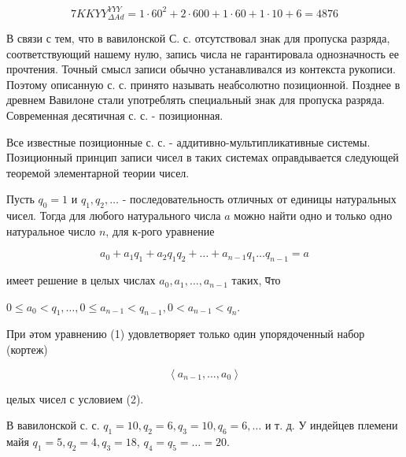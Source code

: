 \documentclass[10pt]{article}
\begin{document}
\[

7 K K Y Y_{\Delta A d}^{Y Y Y}=1 \cdot 60^{2}+2 \cdot 600+1 \cdot 60+1 \cdot 10+6=4876

\]



В связи с тем, что в вавилонской С. с. отсутствовал знак для пропуска разряда, соответствующий нашему нулю, запись числа не гарантировала однозначность ее прочтения. Точный смысл записи обычно устанавливался из контекста рукописи. Поэтому описанную с. с. принято называть неабсолютно позиционной. Позднее в древнем Вавилоне стали употреблять специальный знак для пропуска разряда. Современная десятичная с. с. - позиционная.



Все известные позиционные с. с. - аддитивно-мультипликативные системы. Позиционный принцип записи чисел в таких системах оправдывается следующей теоремой элементарной теории чисел.



Пусть $q_{0}=1$ и $q_{1}, q_{2}, \ldots$ - последовательность отличных от единицы натуральных чисел. Тогда для любого натурального числа $a$ можно найти одно и только одно натуральное число $n$, для к-рого уравнение



\[

a_{0}+a_{1} q_{1}+a_{2} q_{1} q_{2}+\ldots+a_{n-1} q_{1} \ldots q_{n-1}=a

\]



имеет решение в целых числах $a_{0}, a_{1}, \ldots, a_{n-1}$ таких, पто



$0 \leqslant a_{0}<q_{1}, \ldots, 0 \leqslant a_{n-1}<q_{n-1}, 0<a_{n-1}<q_{n}$.



При әтом уравнению (1) удовлетворяет только один упорядоченный набор (кортеж)



\[

\left\langle a_{n-1}, \ldots, a_{0}\right\rangle

\]



целых чисел с условием (2).



В вавилонской с. с. $q_{1}=10, q_{2}=6, q_{3}=10, q_{6}=6, \ldots$ и т. д. У индейцев племени майя $q_{1}=5, q_{2}=4, q_{3}=18$, $q_{4}=q_{5}=\ldots=20$.
\end{document}
